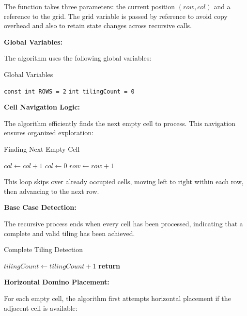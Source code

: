 \documentclass[conference]{IEEEtran}
\begin{document}
The function takes three parameters: the current position $(row, col)$ and a reference to the grid. The grid variable is passed by reference to avoid copy overhead and also to retain state changes across recursive calls.

\textbf{Global Variables:}

The algorithm uses the following global variables:

\begin{algorithm}[htbp]
\caption{Global Variables}
\begin{algorithmic}[1]
\State \texttt{const int ROWS = 2} 
\State \texttt{int tilingCount = 0} 
\end{algorithmic}
\end{algorithm}

\textbf{Cell Navigation Logic:}

The algorithm efficiently finds the next empty cell to process. This navigation ensures organized exploration:

\begin{algorithm}[htbp]
\caption{Finding Next Empty Cell}
\begin{algorithmic}[1]
    \State $col \gets col + 1$
        \State $col \gets 0$
        \State $row \gets row + 1$
    \EndIf
\EndWhile
\end{algorithmic}
\end{algorithm}

This loop skips over already occupied cells, moving left to right within each row, then advancing to the next row.

\textbf{Base Case Detection:}

The recursive process ends when every cell has been processed, indicating that a complete and valid tiling has been achieved.

\begin{algorithm}[htbp]
\caption{Complete Tiling Detection}
\begin{algorithmic}[1]
    \State $tilingCount \gets tilingCount + 1$
    \State \textbf{return}
\EndIf
\end{algorithmic}
\end{algorithm}

\textbf{Horizontal Domino Placement:}

For each empty cell, the algorithm first attempts horizontal placement if the adjacent cell is available:
\end{document}
